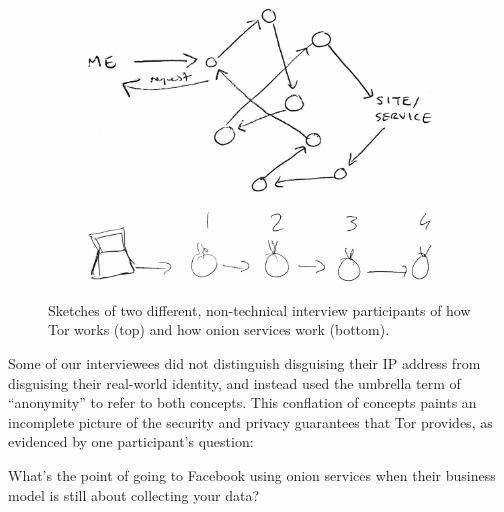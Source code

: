 \begin{figure}[t]
    \centering

    \begin{subfigure}[t]{\linewidth}
        \centering
        \includegraphics[width=0.8\linewidth]{figures/tor-sketch.jpg}
        \label{fig:tor-sketch}
    \end{subfigure}

    \begin{subfigure}[t]{\linewidth}
        \centering
        \includegraphics[width=0.8\linewidth]{figures/os-sketch.jpg}
        \label{fig:os-sketch}
    \end{subfigure}

    \caption{Sketches of two different, non-technical interview participants of
    how Tor works (top) and how onion services work (bottom).}
\end{figure}

Some of our interviewees did not distinguish disguising their IP address from
disguising their real-world identity, and instead used the umbrella term of
``anonymity'' to refer to both concepts.  This conflation of concepts paints an
incomplete picture of the security and privacy guarantees that Tor provides,
as evidenced by one participant's question:

\begin{displayquote}
What's the point of going to Facebook using onion services when their business
model is still about collecting your data?
\end{displayquote}

